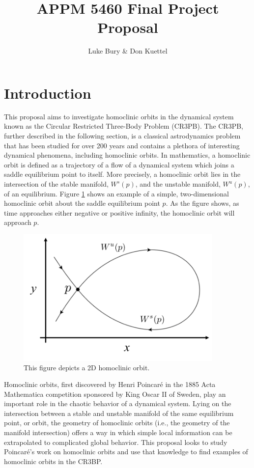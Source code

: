 \documentclass[11pt]{article} %
\title{APPM 5460 Final Project Proposal}
\author{Luke Bury \& Don Kuettel}
\begin{document}
\maketitle
\section*{Introduction}
This proposal aims to investigate homoclinic orbits in the dynamical system known as the Circular Restricted Three-Body Problem (CR3PB). The CR3PB, further described in the following section, is a classical astrodynamics problem that has been studied for over 200 years and contains a plethora of interesting dynamical phenomena, including homoclinic orbits. In mathematics, a homoclinic orbit is defined as a trajectory of a flow of a dynamical system which joins a saddle equilibrium point to itself. More precisely, a homoclinic orbit lies in the intersection of the stable manifold, $W^s(p)$, and the unstable manifold, $W^u(p)$, of an equilibrium. Figure \ref{f:homoclinic_example} shows an example of a simple, two-dimensional homoclinic orbit about the saddle equilibrium point $p$. As the figure shows, as time approaches either negative or positive infinity, the homoclinic orbit will approach $p$. 

\begin{figure}[H]
    \centering
    \includegraphics[width=4in]{homoclinic_orbit.png}
    \caption{This figure depicts a 2D homoclinic orbit.}
    \label{f:homoclinic_example}
\end{figure}

Homoclinic orbits, first discovered by Henri Poincar\'{e} in the 1885 Acta Mathematica competition sponsored by King Oscar II of Sweden, play an important role in the chaotic behavior of a dynamical system. Lying on the intersection between a stable and unstable manifold of the same equilibrium point, or orbit, the geometry of homoclinic orbits (i.e., the geometry of the manifold intersection) offers a way in which simple local information can be extrapolated to complicated global behavior. This proposal looks to study Poincar\'{e}'s work on homoclinic orbits and use that knowledge to find examples of homoclinic orbits in the CR3BP.
\end{document}
